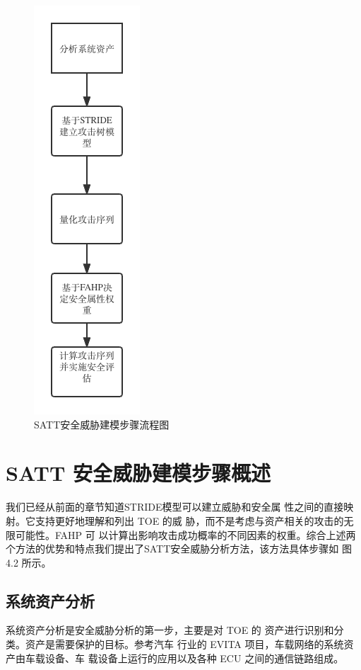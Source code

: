 \begin{figure}
  \centering
  \includegraphics[scale=0.5]{resources/img/a13.png}
  \caption{SATT安全威胁建模步骤流程图}
\end{figure}
\section{SATT 安全威胁建模步骤概述}
我们已经从前面的章节知道STRIDE模型可以建立威胁和安全属
性之间的直接映射。它支持更好地理解和列出 TOE 的威
胁，而不是考虑与资产相关的攻击的无限可能性。FAHP 可
以计算出影响攻击成功概率的不同因素的权重。综合上述两个方法的优势和特点我们提出了SATT安全威胁分析方法，该方法具体步骤如
图 4.2 所示。
\subsection{系统资产分析}
系统资产分析是安全威胁分析的第一步，主要是对 TOE 的
资产进行识别和分类。资产是需要保护的目标。参考汽车
行业的 EVITA 项目，车载网络的系统资产由车载设备、车
载设备上运行的应用以及各种 ECU 之间的通信链路组成\cite{ruddle2009deliverable}。
